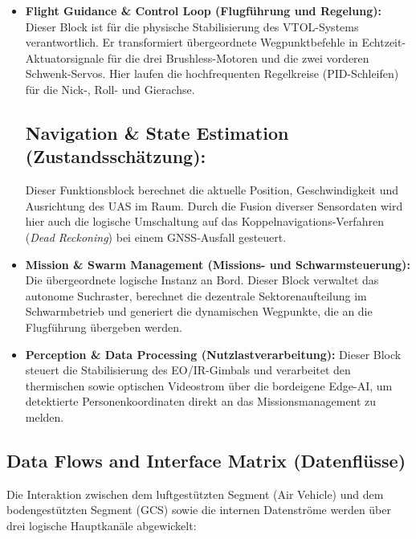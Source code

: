 \begin{itemize}
    \item \textbf{Flight Guidance \& Control Loop (Flugführung und Regelung):} Dieser Block ist für die physische Stabilisierung des VTOL-Systems verantwortlich. 
                                                                               Er transformiert übergeordnete Wegpunktbefehle in Echtzeit-Aktuatorsignale für die drei Brushless-Motoren und die zwei vorderen Schwenk-Servos. 
                                                                               Hier laufen die hochfrequenten Regelkreise (PID-Schleifen) für die Nick-, Roll- und Gierachse.
    \subsection{Navigation \& State Estimation (Zustandsschätzung):} Dieser Funktionsblock berechnet die aktuelle Position, Geschwindigkeit und Ausrichtung des UAS im Raum. 
                                                                     Durch die Fusion diverser Sensordaten wird hier auch die logische Umschaltung auf das Koppelnavigations-Verfahren (\textit{Dead Reckoning}) bei einem GNSS-Ausfall gesteuert.
    \item \textbf{Mission \& Swarm Management (Missions- und Schwarmsteuerung):} Die übergeordnete logische Instanz an Bord. Dieser Block verwaltet das autonome Suchraster, berechnet die dezentrale Sektorenaufteilung 
                                                                                 im Schwarmbetrieb und generiert die dynamischen Wegpunkte, die an die Flugführung übergeben werden.
    \item \textbf{Perception \& Data Processing (Nutzlastverarbeitung):} Dieser Block steuert die Stabilisierung des EO/IR-Gimbals und verarbeitet den thermischen sowie optischen Videostrom über die bordeigene Edge-AI, 
                                                                         um detektierte Personenkoordinaten direkt an das Missionsmanagement zu melden.
\end{itemize}

\subsection{Data Flows and Interface Matrix (Datenflüsse)}
Die Interaktion zwischen dem luftgestützten Segment (Air Vehicle) und dem bodengestützten Segment (GCS) sowie die internen Datenströme werden über drei logische Hauptkanäle abgewickelt:


